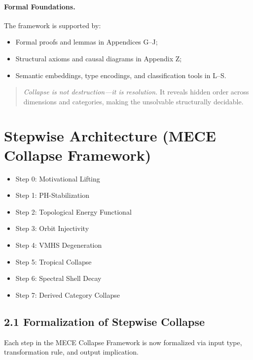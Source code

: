 \documentclass[11pt]{article}
\begin{document}
\paragraph{Formal Foundations.}
The framework is supported by:
\begin{itemize}
  \item Formal proofs and lemmas in Appendices G–J;
  \item Structural axioms and causal diagrams in Appendix Z;
  \item Semantic embeddings, type encodings, and classification tools in L–S.
\end{itemize}

\begin{quote}
\emph{Collapse is not destruction—it is resolution.}  
It reveals hidden order across dimensions and categories, making the unsolvable structurally decidable.
\end{quote}





\section{Stepwise Architecture (MECE Collapse Framework)}
\begin{itemize}
    \item Step 0: Motivational Lifting
    \item Step 1: PH-Stabilization
    \item Step 2: Topological Energy Functional
    \item Step 3: Orbit Injectivity
    \item Step 4: VMHS Degeneration
    \item Step 5: Tropical Collapse
    \item Step 6: Spectral Shell Decay
    \item Step 7: Derived Category Collapse
\end{itemize}

\subsection*{2.1 Formalization of Stepwise Collapse}

Each step in the MECE Collapse Framework is now formalized via input type, transformation rule, and output implication.
\end{document}
